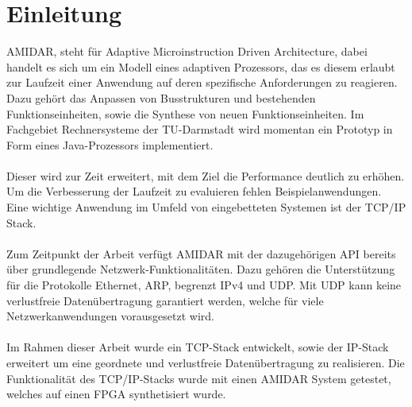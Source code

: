 \chapter{Einleitung}

AMIDAR, steht für Adaptive Microinstruction Driven Architecture, dabei handelt es sich um ein Modell eines adaptiven Prozessors, das es diesem erlaubt zur Laufzeit einer Anwendung auf deren spezifische Anforderungen zu reagieren. Dazu gehört das Anpassen von Busstrukturen und bestehenden Funktionseinheiten, sowie die Synthese von neuen Funktionseinheiten.
Im Fachgebiet Rechnersysteme der TU-Darmstadt wird momentan ein Prototyp in Form eines Java-Prozessors implementiert. \\\\
Dieser wird zur Zeit erweitert, mit dem Ziel die Performance deutlich zu erhöhen. Um die Verbesserung der Laufzeit zu evaluieren fehlen Beispielanwendungen. Eine wichtige Anwendung im Umfeld von eingebetteten Systemen ist der TCP/IP Stack.\\\\
Zum Zeitpunkt der Arbeit verfügt AMIDAR mit der dazugehörigen API bereits über grundlegende Netzwerk-Funktionalitäten. Dazu gehören die Unterstützung für die Protokolle Ethernet, ARP, begrenzt IPv4 und UDP. Mit UDP kann keine verlustfreie Datenübertragung garantiert werden, welche für viele Netzwerkanwendungen vorausgesetzt wird.\\\\
Im Rahmen dieser Arbeit wurde ein TCP-Stack entwickelt, sowie der IP-Stack erweitert um eine geordnete und verlustfreie Datenübertragung zu realisieren. Die Funktionalität des TCP/IP-Stacks wurde mit einen AMIDAR System getestet, welches auf einen FPGA synthetisiert wurde.

